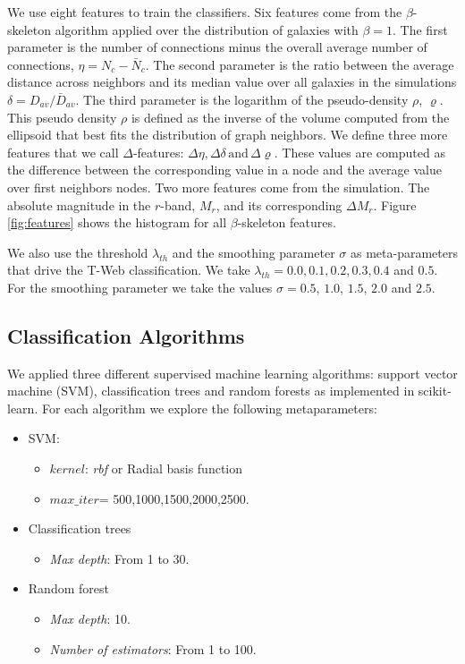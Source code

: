 \documentclass[usenatbib]{mnras}
\begin{document}
We use eight features to train the classifiers.
Six features come from the $\beta$-skeleton algorithm applied over the distribution
of galaxies with $\beta=1$.
The first parameter is the number of connections minus the overall average number of
connections, $\eta = N_c - \bar{N}_c$. 
The second parameter is the ratio between the average distance across neighbors and its median
value over all galaxies in the simulations $\delta=D_{av}/\bar{D}_{av}$.
The third parameter is the logarithm of the pseudo-density $\rho$, $\varrho$. 
This pseudo density $\rho$ is defined as the inverse of the volume computed from the ellipsoid that best fits the distribution of graph neighbors.
We define three more features that we call $\Delta$-features: $\Delta\eta,\Delta\delta\,\text{and}\,\Delta\varrho$. 
These values are computed as the difference between the corresponding value in a node and the 
average value over first neighbors nodes.
Two more features come from the simulation. The absolute magnitude in the 
$r$-band, $M_r$, and its corresponding $\Delta M_r$.
Figure \ref{fig:features} shows the histogram for all $\beta$-skeleton features.

We also use the threshold $\lambda_{th}$ and the smoothing parameter $\sigma$ as
meta-parameters that drive the T-Web classification. 
We take $\lambda_{th}=0.0, 0.1, 0.2, 0.3, 0.4$ and $0.5$.
For the smoothing parameter we take the values $\sigma=0.5$, $1.0$, $1.5$, $2.0$ and $2.5$. 

\subsection{Classification Algorithms}

We applied three different supervised machine learning algorithms: support vector machine (SVM),
classification trees and random forests as implemented in scikit-learn. 
 For each algorithm we explore the following metaparameters:
\begin{itemize}
    \item SVM: 
        \begin{itemize}
            \item $kernel$: \textit{rbf} or Radial basis function
            \item $max\_iter$= 500,1000,1500,2000,2500.
        \end{itemize}
    \item Classification trees
        \begin{itemize}
            \item \textit{Max depth}: From 1 to 30.
        \end{itemize}
    \item Random forest
        \begin{itemize}
            \item \textit{Max depth}: 10.
            \item \textit{Number of estimators}: From 1 to 100.
        \end{itemize}
\end{itemize}
\end{document}
